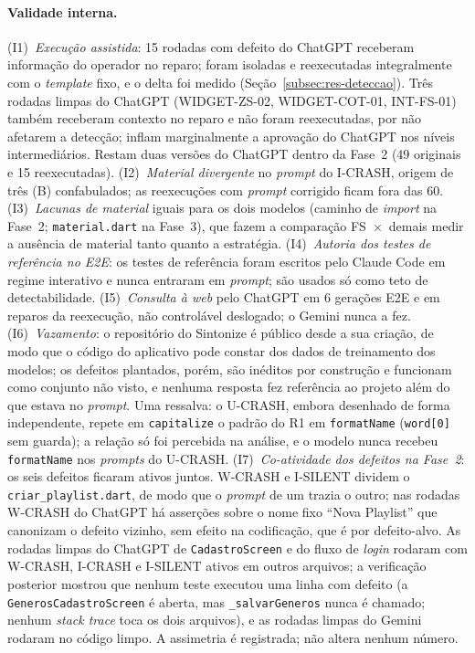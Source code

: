 \documentclass[12pt]{article}
\begin{document}
\paragraph{Validade interna.} (I1)~\emph{Execução assistida}: 15 rodadas
com defeito do ChatGPT receberam informação do operador no reparo; foram
isoladas e reexecutadas integralmente com o \textit{template} fixo, e o
delta foi medido (Seção~\ref{subsec:res-deteccao}). Três rodadas limpas do
ChatGPT (WIDGET-ZS-02, WIDGET-COT-01, INT-FS-01) também receberam contexto no
reparo e não foram reexecutadas, por não afetarem a detecção; inflam
marginalmente a aprovação do ChatGPT nos níveis intermediários. Restam duas versões do ChatGPT dentro da Fase~2 (49 originais e 15
reexecutadas). (I2)~\emph{Material divergente} no \textit{prompt} do
I-CRASH, origem de três (B) confabulados; as reexecuções com
\textit{prompt} corrigido ficam fora das 60. (I3)~\emph{Lacunas de
material} iguais para os dois modelos (caminho de \textit{import} na Fase~2;
\texttt{material.dart} na Fase~3), que fazem a comparação FS~$\times$~demais
medir a ausência de material tanto quanto a estratégia. (I4)~\emph{Autoria dos
testes de referência no E2E}: os testes de referência foram escritos pelo
Claude Code em regime interativo e nunca entraram em \textit{prompt}; são
usados só como teto de detectabilidade. (I5)~\emph{Consulta à \textit{web}}
pelo ChatGPT em 6 gerações E2E e em reparos da reexecução, não controlável
deslogado; o Gemini nunca a fez. (I6)~\emph{Vazamento}: o repositório do Sintonize é público desde a sua
criação, de modo que o código do aplicativo pode constar dos dados de
treinamento dos modelos; os defeitos plantados, porém, são inéditos por
construção e funcionam como conjunto não visto, e nenhuma resposta fez
referência ao projeto além do que estava no \textit{prompt}. Uma ressalva: o U-CRASH, embora desenhado de forma independente,
repete em \texttt{capitalize} o padrão do R1 em \texttt{formatName}
(\texttt{word[0]} sem guarda); a relação só foi percebida na análise, e o
modelo nunca recebeu \texttt{formatName} nos \textit{prompts} do U-CRASH.
(I7)~\emph{Co-atividade dos defeitos na Fase~2}: os seis defeitos ficaram
ativos juntos. W-CRASH e I-SILENT dividem o \texttt{criar\_playlist.dart},
de modo que o \textit{prompt} de um trazia o outro; nas rodadas W-CRASH do
ChatGPT há asserções sobre o nome fixo ``Nova Playlist'' que canonizam o
defeito vizinho, sem efeito na codificação, que é por defeito-alvo. As
rodadas limpas do ChatGPT de \texttt{CadastroScreen} e do fluxo de
\textit{login} rodaram com W-CRASH, I-CRASH e I-SILENT ativos em outros
arquivos; a verificação posterior mostrou que nenhum teste executou uma
linha com defeito (a \texttt{GenerosCadastroScreen} é aberta, mas
\texttt{\_salvarGeneros} nunca é chamado; nenhum \textit{stack trace} toca
os dois arquivos), e as rodadas limpas do Gemini rodaram no código limpo. A
assimetria é registrada; não altera nenhum número.
\end{document}
